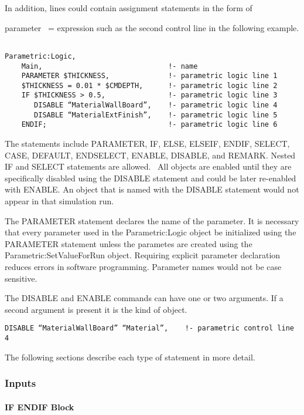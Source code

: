 In addition, lines could contain assignment statements in the form of

parameter~ = expression such as the second control line in the following example.

\begin{lstlisting}

Parametric:Logic,
    Main,                              !- name
    PARAMETER $THICKNESS,              !- parametric logic line 1
    $THICKNESS = 0.01 * $CMDEPTH,      !- parametric logic line 2
    IF $THICKNESS > 0.5,               !- parametric logic line 3
       DISABLE “MaterialWallBoard”,    !- parametric logic line 4
       DISABLE “MaterialExtFinish”,    !- parametric logic line 5
    ENDIF;                             !- parametric logic line 6
\end{lstlisting}

The statements include PARAMETER, IF, ELSE, ELSEIF, ENDIF, SELECT, CASE, DEFAULT, ENDSELECT, ENABLE, DISABLE, and REMARK. Nested IF and SELECT statements are allowed.~ All objects are enabled until they are specifically disabled using the DISABLE statement and could be later re-enabled with ENABLE. An object that is named with the DISABLE statement would not appear in that simulation run.

The PARAMETER statement declares the name of the parameter. It is necessary that every parameter used in the Parametric:Logic object be initialized using the PARAMETER statement unless the parametes are created using the Parametric:SetValueForRun object. Requiring explicit parameter declaration reduces errors in software programming. Parameter names would not be case sensitive.

The DISABLE and ENABLE commands can have one or two arguments. If a second argument is present it is the kind of object.

\begin{lstlisting}
DISABLE “MaterialWallBoard” “Material”,    !- parametric control line 4
\end{lstlisting}

The following sections describe each type of statement in more detail.

\subsubsection{Inputs}\label{inputs-1-027}

\paragraph{IF ENDIF Block}\label{if-endif-block}


